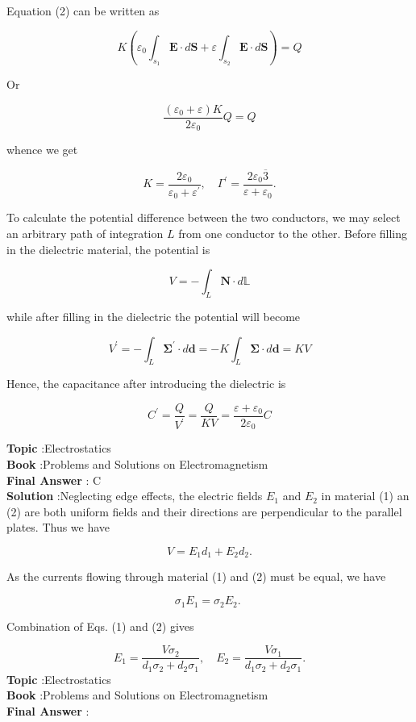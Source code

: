 \documentclass[10pt]{article}
\begin{document}
Equation (2) can be written as

$$
K\left(\varepsilon_{0} \int_{s_{1}} \mathbf{E} \cdot d \mathbf{S}+\varepsilon \int_{s_{2}} \mathbf{E} \cdot d \mathbf{S}\right)=Q
$$

Or

$$
\frac{\left(\varepsilon_{0}+\varepsilon\right) K}{2 \varepsilon_{0}} Q=Q
$$

whence we get

$$
K=\frac{2 \varepsilon_{0}}{\varepsilon_{0}+\varepsilon^{\prime}}, \quad \Gamma^{\prime}=\frac{2 \varepsilon_{0} \overline{3}}{\varepsilon+\varepsilon_{0}} .
$$

To calculate the potential difference between the two conductors, we may select an arbitrary path of integration $L$ from one conductor to the other. Before filling in the dielectric material, the potential is

$$
V=-\int_{L} \boldsymbol{N} \cdot d \mathbb{L}
$$

while after filling in the dielectric the potential will become

$$
V^{\prime}=-\int_{L} \boldsymbol{\Sigma}^{\prime} \cdot d \boldsymbol{d}=-K \int_{L} \boldsymbol{\Sigma} \cdot d \boldsymbol{d}=K V
$$

Hence, the capacitance after introducing the dielectric is

$$
C^{\prime}=\frac{Q}{V^{\prime}}=\frac{Q}{K V}=\frac{\varepsilon+\varepsilon_{0}}{2 \varepsilon_{0}} C
$$


\textbf{Topic} :Electrostatics\\
\textbf{Book} :Problems and Solutions on Electromagnetism\\
\textbf{Final Answer} : C\\


\textbf{Solution} :Neglecting edge effects, the electric fields $E_{1}$ and $E_{2}$ in material (1) an (2) are both uniform fields and their directions are perpendicular to the parallel plates. Thus we have

$$
V=E_{1} d_{1}+E_{2} d_{2} .
$$

As the currents flowing through material (1) and (2) must be equal, we have

$$
\sigma_{1} E_{1}=\sigma_{2} E_{2} \text {. }
$$

Combination of Eqs.
(1) and (2) gives

$$
E_{1}=\frac{V \sigma_{2}}{d_{1} \sigma_{2}+d_{2} \sigma_{1}}, \quad E_{2}=\frac{V \sigma_{1}}{d_{1} \sigma_{2}+d_{2} \sigma_{1}} .
$$
\textbf{Topic} :Electrostatics\\
\textbf{Book} :Problems and Solutions on Electromagnetism\\
\textbf{Final Answer} :\\
\end{document}
